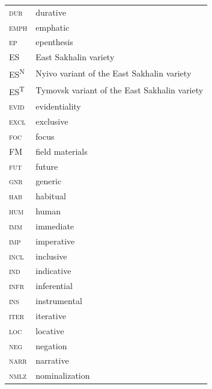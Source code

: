 \documentclass[output=paper,colorlinks,citecolor=brown]{langscibook}
\begin{document}
\begin{tabularx}{.45\textwidth}{lQ}
\scshape dur  & durative  \\
\scshape emph & emphatic\\
\scshape ep & epenthesis\\
ES & East Sakhalin variety\\
ES\textsuperscript{N} & Nyivo variant of the East Sakhalin variety\\
ES\textsuperscript{T} & Tymovsk variant of the East Sakhalin variety\\
\scshape evid & evidentiality\\
\scshape excl & exclusive\\
\scshape foc & focus \\
FM & field materials\\
\scshape fut & future\\
\scshape gnr & generic \\
\scshape hab & habitual\\
\scshape hum & human\\
\scshape imm  & immediate  \\
\scshape imp & imperative\\
\scshape incl & inclusive\\
\scshape ind & indicative\\
\scshape infr & inferential \\
\scshape ins & instrumental\\
\scshape iter & iterative\\
\scshape loc & locative\\
\scshape neg & negation\\
\scshape narr  & narrative  \\
\scshape nmlz & nominalization\\
\end{tabularx}
\end{document}
